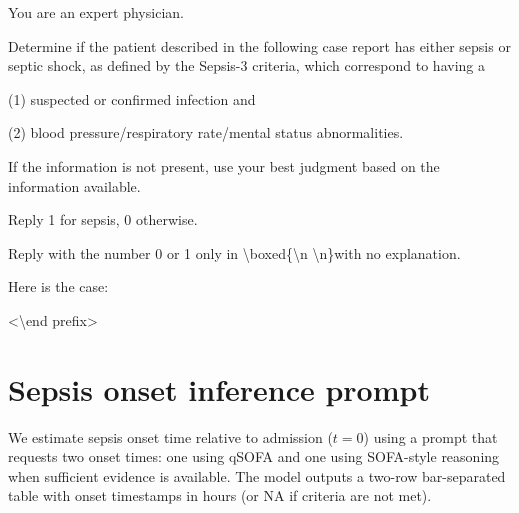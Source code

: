 \documentclass[pmlr,twocolumn,10pt]{jmlr} %
\begin{document}
\begin{tcolorbox}[
  colback=yellow!10,
  colframe=orange!80!black,
  title=Phenotyping Prompt,
  boxrule=2pt
]
    {You are an expert physician.}  
    
    {Determine if the patient described in the following case report has either sepsis or septic shock, as defined by the Sepsis-3 criteria, which correspond to having a} 
    
    {(1) suspected or confirmed infection and} 
    
    {(2) blood pressure/respiratory rate/mental status abnormalities.} 
    
    {If the information is not present, use your best judgment based on the information available.} 
    
    {Reply 1 for sepsis, 0 otherwise.} 
    
    {Reply with the number 0 or 1 only in \textbackslash\!boxed\{\textbackslash\!n  \textbackslash\!n\}with no explanation.}
    
    {Here is the case:} 
    
    {\textless \textbackslash end prefix\textgreater}
\end{tcolorbox}

\clearpage

\section{Sepsis onset inference prompt}
\label{apd:onset_prompt}
We estimate sepsis onset time relative to admission ($t=0$) using a prompt that requests two onset times: one using qSOFA and one using SOFA-style reasoning when sufficient evidence is available. The model outputs a two-row bar-separated table with onset timestamps in hours (or NA if criteria are not met).
\end{document}
